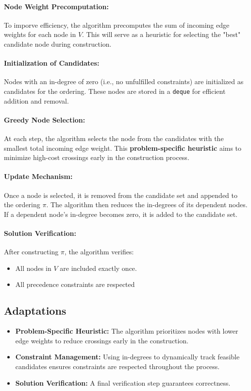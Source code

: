 \documentclass{article}
\begin{document}
\paragraph{Node Weight Precomputation:}
To imporve efficiency, the algorithm precomputes the sum of incoming edge weights for each node in \( V \). This will serve as a heuristic for selecting the "best" candidate node during construction.

\paragraph{Initialization of Candidates:}
Nodes with an in-degree of zero (i.e., no unfulfilled constraints) are initialized as candidates for the ordering. These nodes are stored in a \texttt{deque} for efficient addition and removal.

\paragraph{Greedy Node Selection:}
At each step, the algorithm selects the node from the candidates with the smallest total incoming edge weight. This \textbf{problem-specific heuristic} aims to minimize high-cost crossings early in the construction process.

\paragraph{Update Mechanism:}
Once a node is selected, it is removed from the candidate set and appended to the ordering \( \pi \). The algorithm then reduces the in-degrees of its dependent nodes. If a dependent node's in-degree becomes zero, it is added to the candidate set.

\paragraph{Solution Verification:}
After constructing \( \pi \), the algorithm verifies:
\begin{itemize}
    \item All nodes in \( V \) are included exactly once.
    \item All precedence constraints are respected
\end{itemize}

\subsection*{Adaptations}
\begin{itemize}
    \item \textbf{Problem-Specific Heuristic:} The algorithm prioritizes nodes with lower edge weights to reduce crossings early in the construction.
    \item \textbf{Constraint Management:} Using in-degrees to dynamically track feasible candidates ensures constraints are respected throughout the process.
    \item \textbf{Solution Verification:} A final verification step guarantees correctness.
\end{itemize}
\end{document}
